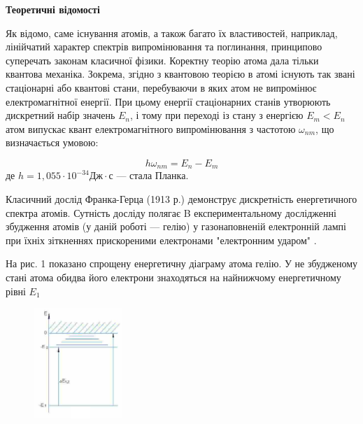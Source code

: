 \documentclass[12pt,a4paper]{article}
\begin{document}
    \vspace{1em}

    \begin{center} \textbf{\large Теоретичні відомості} \end{center}

    \setlength{\parindent}{1.5em}

    Як відомо, саме існування атомів, а також багато їх властивостей, наприклад, лінійчатий характер спектрів випромінювання та поглинання, принципово суперечать законам класичної фізики. Коректну теорію атома дала тільки квантова механіка. Зокрема, згідно з квантовою теорією в атомі існують так звані стаціонарні або квантові стани, перебуваючи в яких атом не випромінює електромагнітної енергії. При цьому енергії стаціонарних станів утворюють дискретний набір значень 
    $E_n$, і тому при переході із стану з енергією $E_m < E_n$ атом випускає квант електромагнітного випромінювання з частотою
    $\omega_{nm}$, що визначається умовою:

    \begin{equation}
        h\omega_{nm} = E_n - E_m
        \tag{1}
    \end{equation}
    де $h = 1{,}055 \cdot 10^{-34} \text{Дж} \cdot \text{с}$ --- стала Планка.

    Класичний дослід Франка-Герца (1913 р.) демонструє дискретність енергетичного спектра
    атомів. Сутність досліду полягає B експериментальному дослідженні збудження атомів
    (у даній роботі --- гелію) у газонаповненій електронній лампі при їхніх зіткненнях прискореними електронами "електронним ударом"
    .

    На рис. 1 показано спрощену енергетичну діаграму атома гелію. У не збудженому стані атома обидва його електрони знаходяться на найнижчому енергетичному рівні
    $E_1$

    \begin{figure}[h!]

        \renewcommand{\thefigure}{\arabic{figure}} %

        \centering
        \includegraphics[width=0.3\textwidth]{1.png}
        \caption{}
        \label{fig1:schema}

    \end{figure}
\end{document}
